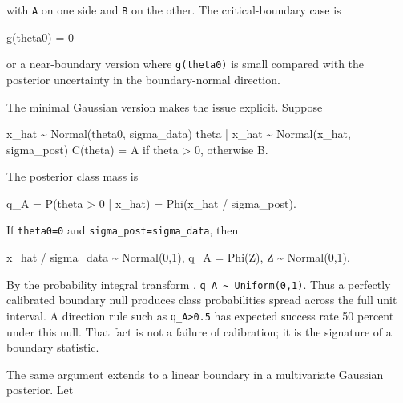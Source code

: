 \documentclass[
]{article}
\newenvironment{Shaded}{}{}
\newcommand{\NormalTok}[1]{#1}
\begin{document}
with \texttt{A} on one side and \texttt{B} on the other. The
critical-boundary case is

\begin{Shaded}
\begin{Highlighting}[]
\NormalTok{g(theta0) = 0}
\end{Highlighting}
\end{Shaded}

or a near-boundary version where \texttt{g(theta0)} is small compared
with the posterior uncertainty in the boundary-normal direction.

The minimal Gaussian version makes the issue explicit. Suppose

\begin{Shaded}
\begin{Highlighting}[]
\NormalTok{x\_hat \textasciitilde{} Normal(theta0, sigma\_data)}
\NormalTok{theta | x\_hat \textasciitilde{} Normal(x\_hat, sigma\_post)}
\NormalTok{C(theta) = A if theta \textgreater{} 0, otherwise B.}
\end{Highlighting}
\end{Shaded}

The posterior class mass is

\begin{Shaded}
\begin{Highlighting}[]
\NormalTok{q\_A = P(theta \textgreater{} 0 | x\_hat) = Phi(x\_hat / sigma\_post).}
\end{Highlighting}
\end{Shaded}

If \texttt{theta0=0} and \texttt{sigma\_post=sigma\_data}, then

\begin{Shaded}
\begin{Highlighting}[]
\NormalTok{x\_hat / sigma\_data \textasciitilde{} Normal(0,1),}
\NormalTok{q\_A = Phi(Z),  Z \textasciitilde{} Normal(0,1).}
\end{Highlighting}
\end{Shaded}

By the probability integral transform \citep{Rosenblatt1952},
\texttt{q\_A\ \textasciitilde{}\ Uniform(0,1)}. Thus a perfectly
calibrated boundary null produces class probabilities spread across the
full unit interval. A direction rule such as
\texttt{q\_A\textgreater{}0.5} has expected success rate 50 percent
under this null. That fact is not a failure of calibration; it is the
signature of a boundary statistic.

The same argument extends to a linear boundary in a multivariate
Gaussian posterior. Let
\end{document}
